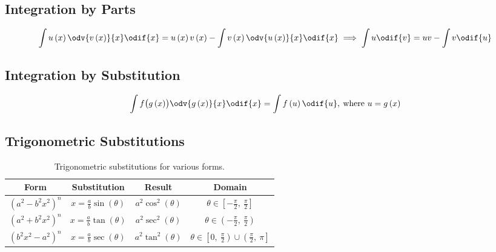 \documentclass{article}
\begin{document}
\begin{appendix}
    \subsection{Integration by Parts}
    \begin{theorem}
        \begin{equation*}
            \int u\left( x \right) \odv{v\left( x \right)}{x} \odif{x} = u\left( x \right) v\left( x \right) - \int v\left( x \right) \odv{u\left( x \right)}{x} \odif{x} \implies \int u \odif{v} = uv - \int v \odif{u}
        \end{equation*}
    \end{theorem}
    \subsection{Integration by Substitution}
    \begin{theorem}
        \begin{equation*}
            \int f\bigl(g\left( x \right)\bigr)\odv{g\left( x \right)}{x} \odif{x} = \int f\left( u \right) \odif{u}, \: \text{where } u = g\left( x \right)
        \end{equation*}
    \end{theorem}
    \subsection{Trigonometric Substitutions}
    \begin{table}[H]
        \renewcommand*{\arraystretch}{1.5}
        \centering
        \begin{tabular}{c c c c}
            \toprule
            \textbf{Form}                 & \textbf{Substitution}                                      & \textbf{Result}                      & \textbf{Domain}                                                                        \\
            \midrule
            \(\left(a^2-b^2x^2\right)^n\) & \(\displaystyle x=\frac{a}{b}\sin{\left( \theta \right)}\) & \(a^2\cos^2{\left( \theta \right)}\) & \(\theta\in \left[ -\frac{\pi}{2},\: \frac{\pi}{2} \right]\)                           \\[8pt]
            \(\left(a^2+b^2x^2\right)^n\) & \(\displaystyle x=\frac{a}{b}\tan{\left( \theta \right)}\) & \(a^2\sec^2{\left( \theta \right)}\) & \(\theta\in \left( -\frac{\pi}{2},\: \frac{\pi}{2} \right)\)                           \\[8pt]
            \(\left(b^2x^2-a^2\right)^n\) & \(\displaystyle x=\frac{a}{b}\sec{\left( \theta \right)}\) & \(a^2\tan^2{\left( \theta \right)}\) & \(\theta\in \left[ 0,\: \frac{\pi}{2} \right) \cup \left(\frac{\pi}{2},\: \pi\right]\) \\
            \bottomrule
        \end{tabular}
        \caption{Trigonometric substitutions for various forms.}
    \end{table}
\end{appendix}
\end{document}
